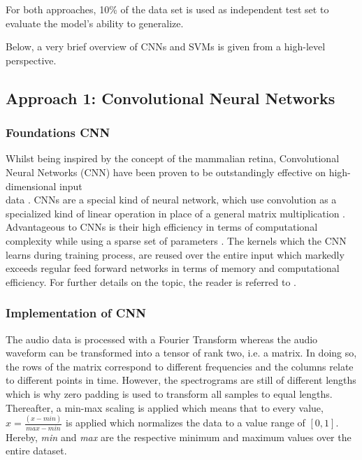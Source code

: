 \documentclass[11pt,a4paper,twoside]{article}
\theoremstyle{thmbreak}
\numberwithin{Theorem}{subsection}
\theoremstyle{defbreak}
\theoremstyle{remark}
\theoremstyle{remark}
\begin{document}

For both approaches,  10\% of the data set is used as independent test set to evaluate the  model's ability to generalize.

Below, a very brief overview of CNNs and SVMs  is given from a high-level perspective.


\subsection{Approach 1: Convolutional Neural Networks}
\label{CNN}
\subsubsection{Foundations CNN}
Whilst being inspired by the concept of the mammalian retina, Convolutional Neural Networks (CNN) have been proven to be outstandingly effective on high-dimensional input \\
data \cite{Goodfellow-et-al-2016}. 
CNNs are a special kind of neural network, which use convolution as a specialized kind of linear operation in place of a general matrix multiplication  \cite{Goodfellow-et-al-2016}.
Advantageous to CNNs is their high efficiency in terms of  computational complexity while using a sparse set of parameters \cite{Goodfellow-et-al-2016}. 
The kernels which the CNN learns during training process, are reused over the entire input which markedly exceeds regular feed forward networks in terms of memory and computational efficiency.
For further details on the topic, the reader is referred to \cite{Goodfellow-et-al-2016}.


\subsubsection{Implementation of CNN}
The audio data is processed with a Fourier Transform whereas the audio waveform can be transformed into a tensor of rank two, i.e. a matrix. 
In doing so, the rows of the matrix correspond to different frequencies and the columns relate to different points in time.
However, the spectrograms are still of different lengths which is why zero padding is used to transform all samples to equal lengths. 
Thereafter, a min-max scaling is applied which means that to every value, $x = \frac{(x-min)}{max-min}$ is applied which normalizes the data to a value range of $[0,1]$. Hereby, \textit{min} and \textit{max} are the respective minimum and maximum values over the entire dataset.
\end{document}
